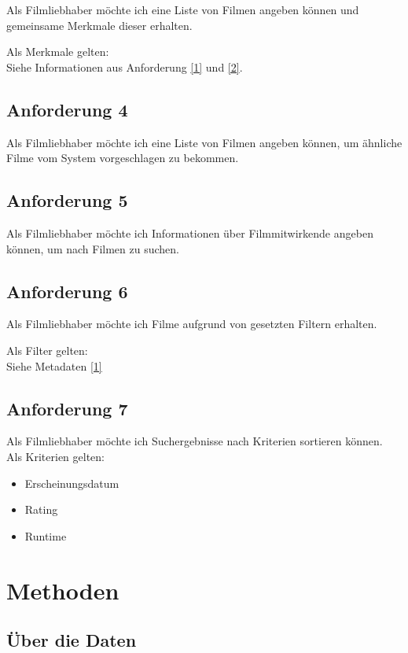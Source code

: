 \documentclass[conference]{IEEEtran}
\begin{document}
Als Filmliebhaber möchte ich eine Liste von Filmen angeben können
und gemeinsame Merkmale dieser erhalten.

Als Merkmale gelten:
\\
Siehe Informationen aus Anforderung \ref{1} und \ref{2}.

\subsection{Anforderung 4}

Als Filmliebhaber möchte ich eine Liste von Filmen angeben können,
um ähnliche Filme vom System vorgeschlagen zu bekommen.


\subsection{Anforderung 5}
Als Filmliebhaber möchte ich Informationen über Filmmitwirkende angeben können,
um nach Filmen zu suchen.

\subsection{Anforderung 6}

Als Filmliebhaber möchte ich Filme aufgrund von gesetzten Filtern erhalten.

Als Filter gelten:
\\
Siehe Metadaten \ref{1}

\subsection{Anforderung 7}

Als Filmliebhaber möchte ich Suchergebnisse nach Kriterien sortieren können.
\\
Als Kriterien gelten:

\begin{itemize}
	\item Erscheinungsdatum
	\item Rating
	\item Runtime
\end{itemize}

\section{Methoden}

\subsection*{Über die Daten}
\end{document}
